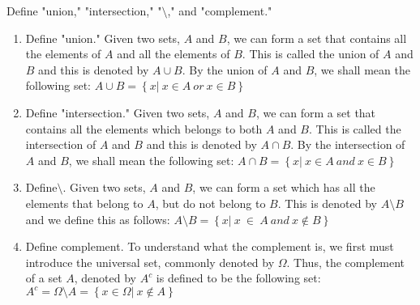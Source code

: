 \documentclass[12pt]{article}
\begin{document}
\problem Define "union," "intersection," "$\setminus$," and "complement."
\begin{enumerate}
\item Define "union." Given two sets, $A$ and $B$, we can form a set that contains all the elements of $A$ and all the elements of $B$. This is called the union of $A$ and $B$ and this is denoted by $A \cup B$. By the union of $A$ and $B$, we shall mean the following set: $A \cup B = \left\{ {x|~x \in A \: or \: x \in B}\right\}$
\item Define "intersection." Given two sets, $A$ and $B$, we can form a set that contains all the elements which belongs to both $A$ and $B$. This is called the intersection of $A$ and $B$ and this is denoted by $A \cap B$. By the intersection of $A$ and $B$, we shall mean the following set: $A \cap B = \left\{ {x|~x \in A \:and\: x \in B}\right\}$
\item Define$\setminus$. Given two sets, $A$ and $B$, we can form a set which has all the elements that belong to $A$, but do not belong to $B$. This is denoted by $A \setminus B$ and we define this as follows: $A \setminus B = \left\lbrace x |~x \: \in \: A \: and \: x \notin B \right\rbrace $
\item Define complement. To understand what the complement is, we first must introduce the universal set, commonly denoted by $\Omega$. Thus, the complement of a set $A$, denoted by $A^{c}$ is defined to be the following set: $A^{c} = \Omega \setminus A= \left\lbrace x \in \Omega|~x \notin A \right\rbrace$
\end{enumerate}  
\end{document}
